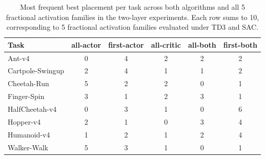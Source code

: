 \begin{table}[!htbp]
\centering
\caption{Most frequent best placement per task across both algorithms and all 5 fractional activation families in the two-layer experiments. Each row sums to 10, corresponding to 5 fractional activation families evaluated under TD3 and SAC.}
\label{tab:fractional-placement-by-task}
\small
\setlength{\tabcolsep}{5pt}
\renewcommand{\arraystretch}{1.08}
\begin{tabular}{lccccc}
\toprule
Task & all-actor & first-actor & all-critic & all-both & first-both \\
\midrule
Ant-v4 & 0 & 4 & 2 & 2 & 2 \\
Cartpole-Swingup & 2 & 4 & 1 & 1 & 2 \\
Cheetah-Run & 5 & 2 & 2 & 0 & 1 \\
Finger-Spin & 3 & 1 & 2 & 3 & 1 \\
HalfCheetah-v4 & 0 & 3 & 1 & 0 & 6 \\
Hopper-v4 & 2 & 1 & 0 & 3 & 4 \\
Humanoid-v4 & 1 & 2 & 1 & 2 & 4 \\
Walker-Walk & 5 & 3 & 1 & 0 & 1 \\
\bottomrule
\end{tabular}
\end{table}
